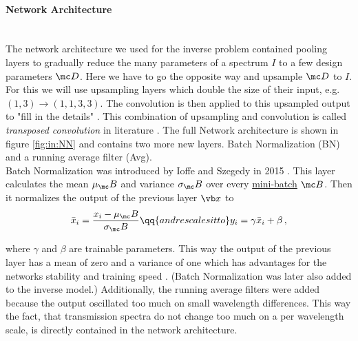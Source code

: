 \paragraph{Network Architecture}~\\
The network architecture we used for the inverse problem contained pooling layers to gradually reduce the many parameters of a spectrum $I$ to a few design parameters $\mc D$. Here we have to go the opposite way and upsample $\mc D$ to $I$. For this we will use upsampling layers which double the size of their input, e.g. $(1,3) \rightarrow (1,1,3,3)$. The convolution is then applied to this upsampled output to "fill in the details" . This combination of upsampling and convolution is called \textit{transposed convolution} in literature . The full Network architecture is shown in figure \ref{fig:in:NN} and contains two more new layers. Batch Normalization (BN) and a running average filter (Avg).
\\

\indent
Batch Normalization was introduced by Ioffe and Szegedy in 2015 \cite{Ioffe2015}. This layer calculates the mean $\mu_\mc B$ and variance $\sigma_\mc B$ over every \hyperref[hyp:minibatch]{mini-batch} $\mc B$. Then it normalizes the output of the previous layer $\vb x$ to 
\begin{equation}
    \bar x_i = \frac{x_i - \mu_\mc B}{\sigma_\mc B}
    \qq{and rescales it to}
    y_i = \gamma \bar x_i + \beta \,,
\end{equation}

where $\gamma$ and $\beta$ are trainable parameters. This way the output of the previous layer has a mean of zero and a variance of one which has advantages for the networks stability and training speed .
(Batch Normalization was later also added to the inverse model.)
Additionally, the running average filters were added because the output oscillated too much on small wavelength differences.
This way the fact, that transmission spectra do not change too much on a per wavelength scale, is directly contained in the network architecture. 
\\

